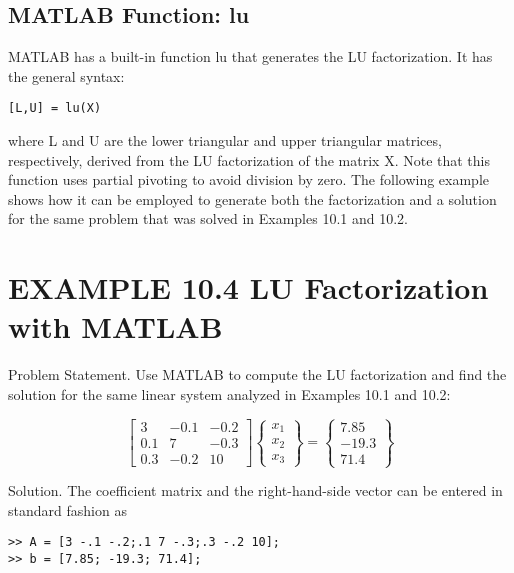 \documentclass[../main.tex]{subfiles}
\begin{document}
\subsection{MATLAB Function: lu}

MATLAB has a built-in function lu that generates the LU factorization. It has the general
syntax:

\begin{lstlisting}[numbers=none]
[L,U] = lu(X)
\end{lstlisting}

where L and U are the lower triangular and upper triangular matrices, respectively, derived from the LU factorization of the matrix X. Note that this function uses partial pivoting to avoid division by zero. The following example shows how it can be employed to generate both the factorization and a solution for the same problem that was solved in Examples 10.1 and 10.2.

\section*{EXAMPLE 10.4 LU Factorization with MATLAB}

Problem Statement. Use MATLAB to compute the LU factorization and find the
solution for the same linear system analyzed in Examples 10.1 and 10.2:

\begin{equation}
\begin{bmatrix}
3 & -0.1 & -0.2 \\ 
0.1 & 7 & -0.3 \\ 
0.3 & -0.2 & 10
\end{bmatrix}
\begin{Bmatrix}
x_{1}\\ 
x_{2}\\ 
x_{3}
\end{Bmatrix}
=
\begin{Bmatrix}
7.85\\ 
-19.3\\ 
71.4
\end{Bmatrix}
\end{equation}

Solution. The coefficient matrix and the right-hand-side vector can be entered in standard fashion as

\begin{lstlisting}[numbers=none]
>> A = [3 -.1 -.2;.1 7 -.3;.3 -.2 10];
>> b = [7.85; -19.3; 71.4];
\end{lstlisting}
\end{document}
